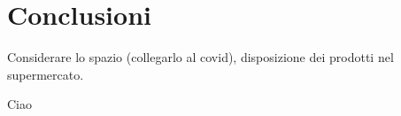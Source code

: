 \chapter{Conclusioni}

 Considerare lo spazio (collegarlo al
covid), disposizione dei prodotti nel supermercato.

Ciao
